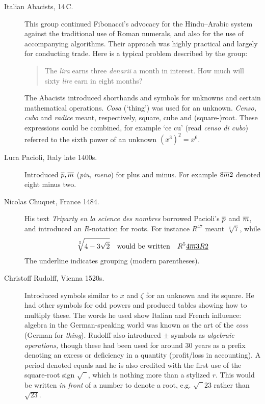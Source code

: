 \begin{description}
	\item[Italian Abacists, 14\th\,C.] This group continued Fibonacci's advocacy for the Hindu--Arabic system against the traditional use of Roman numerals, and also for the use of accompanying algorithms. Their approach was highly practical and largely for conducting trade. Here is a typical problem described by the group:
  \begin{quote}
  The \emph{lira} earns three \emph{denarii} a month in interest. How much will sixty \emph{lire} earn in eight months?
  \end{quote}
  The Abacists introduced shorthands and symbols for unknowns and certain mathematical operations. \emph{Cosa} (`thing') was used for an unknown. \emph{Censo, cubo} and \emph{radice} meant, respectively, square, cube and (square-)root. These expressions could be combined, for example `ce cu' (read \emph{censo di cubo}) referred to the sixth power of an unknown $(x^3)^2=x^6$.
  
  \item[Luca Pacioli, Italy late 1400s.] Introduced $\overline{p},\overline{m}$ (\emph{piu, meno}) for plus and minus. For example $8\overline{m} 2$ denoted eight minus two. 
  
  \item[Nicolas Chuquet, France 1484.] His text \emph{Triparty en la science des nombres} borrowed Pacioli's $\overline{p}$ and $\overline{m}$, and introduced an $R$-notation for roots. For instance $R^47$ meant $\sqrt[4]7$, while
  \[
  	\sqrt[5]{4-3\sqrt 2}\quad\text{would be written}\quad R^5\underline{4\overline{m}3R2}
  \]
  The underline indicates grouping (modern parentheses).
  
	\item[Christoff Rudolff, Vienna 1520s.] Introduced symbols similar to $x$ and $\zeta$ for an unknown and its square. He had other symbols for odd powers and produced tables showing how to multiply these. The words he used show Italian and French influence: algebra in the German-speaking world was known as the art of the \emph{coss} (German for \emph{thing}). Rudolff also introduced $\pm$ symbols as \emph{algebraic operations,} though these had been used for around 30 years as a prefix denoting an excess or deficiency in a quantity (profit/loss in accounting). A period denoted equals and he is also credited with the first use of the square-root sign $\sqrt{\phantom 1\!\!}$, which is nothing more than a stylized $r$. This would be written \emph{in front} of a number to denote a root, e.g. $\sqrt{\phantom 1\!\!}23$ rather than $\sqrt{23}$.
	

\end{description}
